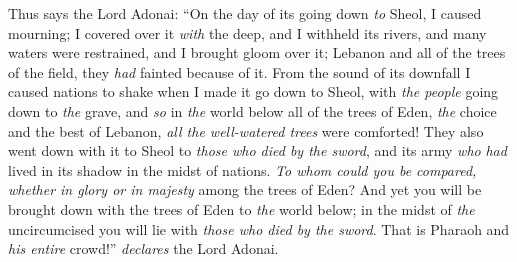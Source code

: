 \begin{biblechapter}
\verse Thus says the Lord Adonai: “On the day of its going down \textit{to} Sheol, I caused mourning; I covered over it \textit{with} the deep, and I withheld its rivers, and many waters were restrained, and I brought gloom over it; Lebanon and all of the trees of the field, they \textit{had} fainted because of it.
\verse From the sound of its downfall I caused nations to shake when I made it go down to Sheol, with \textit{the people} going down to \textit{the} grave, and \textit{so} in \textit{the} world below all of the trees of Eden, \textit{the} choice and the best of Lebanon, \textit{all the well-watered trees} were comforted!
\verse They also went down with it to Sheol to \textit{those who died by the sword}, and its army \textit{who} \textit{had} lived in its shadow in the midst of nations.
\verse \textit{To whom could you be compared, whether in glory or in majesty} among the trees of Eden? And yet you will be brought down with the trees of Eden to \textit{the} world below; in the midst of \textit{the} uncircumcised you will lie with \textit{those who died by the sword}. That is Pharaoh and \textit{his entire} crowd!” \textit{declares} the Lord Adonai.
\end{biblechapter}


